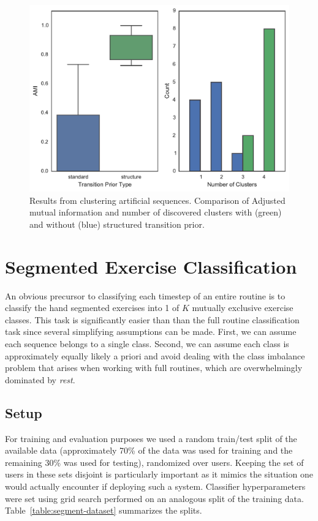\documentclass[12pt]{report}
\newcommand{\1}[0]{\mathbbm{1}}
\begin{document}
\begin{figure}[H]
    \centering
    \includegraphics[width=\textwidth]{./img/artificial-cluster-results.pdf}
    \caption[Synthetic sequence clustering results]{
        Results from clustering artificial sequences.
        Comparison of Adjusted mutual information and number of discovered
        clusters with (green) and without (blue) structured transition prior.
    }
    \label{fig:artificial-cluster-metrics}
\end{figure}


\chapter{Segmented Exercise Classification}
\label{chap:Segmented Exercise Classification}
An obvious precursor to classifying each timestep of an entire routine is to classify the hand segmented
exercises into 1 of $K$ mutually exclusive exercise classes. This task is significantly easier than
than the full routine classification task since several simplifying assumptions can be made. First,
we can assume each sequence belongs to a single class. Second, we can assume each class is approximately
equally likely a priori and avoid dealing with the class imbalance problem that arises when working with
full routines, which are overwhelmingly dominated by \emph{rest}.

\section{Setup}
For training and evaluation purposes we used a random train/test split of the
available data (approximately 70\% of the data was used for training and the remaining
30\% was used for testing), randomized over users. Keeping the set of users in these sets
disjoint is particularly important as it mimics the situation one would actually encounter
if deploying such a system. Classifier hyperparameters were set using grid search performed on an
analogous split of the training data. Table~\ref{table:segment-dataset} summarizes the splits.
\end{document}
